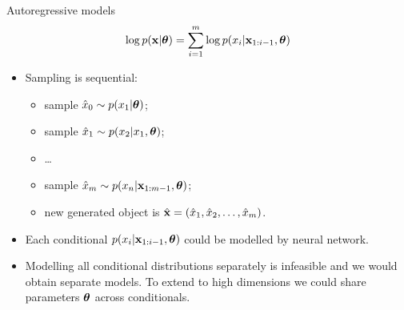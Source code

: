 \begin{frame}{Autoregressive models}
    \[
    \log p(\mathbf{x}| \boldsymbol{\theta}) = \sum_{i=1}^m \log p(x_i | \mathbf{x}_{1:i - 1}, \boldsymbol{\theta})
    \]
    \begin{itemize}
	    \item Sampling is sequential:
	    \begin{itemize}
    		\item sample $\hat{x}_0 \sim p(x_1 | \boldsymbol{\theta})$;
    		\item sample $\hat{x}_1 \sim p(x_2 | x_1, \boldsymbol{\theta})$;
    		\item \dots
    		\item sample $\hat{x}_m \sim p(x_n | \mathbf{x}_{1:m-1}, \boldsymbol{\theta})$;
    		\item new generated object is $\hat{\mathbf{x}} = (\hat{x}_1, \hat{x}_2, \dots, \hat{x}_m)$.
    	\end{itemize}
        \item Each conditional $p(x_i | \mathbf{x}_{1:i - 1}, \boldsymbol{\theta})$ could be modelled by neural network.
        \item Modelling all conditional distributions separately is infeasible and we would obtain separate models. To extend to high dimensions we could share parameters $\boldsymbol{\theta}$ across conditionals.

    \end{itemize}
\end{frame}
